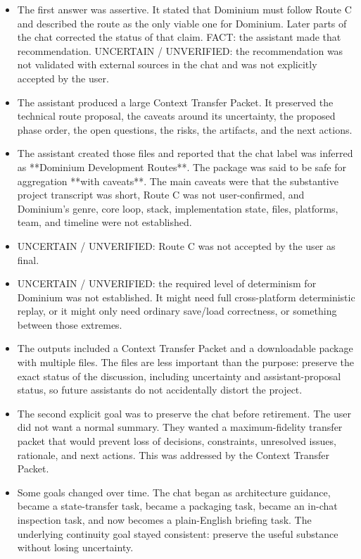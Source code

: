 \documentclass[11pt,a4paper]{report}
\begin{document}
\begin{itemize}
\item The first answer was assertive. It stated that Dominium must follow Route C and described the route as the only viable one for Dominium. Later parts of the chat corrected the status of that claim. FACT: the assistant made that recommendation. UNCERTAIN / UNVERIFIED: the recommendation was not validated with external sources in the chat and was not explicitly accepted by the user.
\item The assistant produced a large Context Transfer Packet. It preserved the technical route proposal, the caveats around its uncertainty, the proposed phase order, the open questions, the risks, the artifacts, and the next actions.
\item The assistant created those files and reported that the chat label was inferred as **Dominium Development Routes**. The package was said to be safe for aggregation **with caveats**. The main caveats were that the substantive project transcript was short, Route C was not user-confirmed, and Dominium's genre, core loop, stack, implementation state, files, platforms, team, and timeline were not established.
\item UNCERTAIN / UNVERIFIED: Route C was not accepted by the user as final.
\item UNCERTAIN / UNVERIFIED: the required level of determinism for Dominium was not established. It might need full cross-platform deterministic replay, or it might only need ordinary save/load correctness, or something between those extremes.
\item The outputs included a Context Transfer Packet and a downloadable package with multiple files. The files are less important than the purpose: preserve the exact status of the discussion, including uncertainty and assistant-proposal status, so future assistants do not accidentally distort the project.
\item The second explicit goal was to preserve the chat before retirement. The user did not want a normal summary. They wanted a maximum-fidelity transfer packet that would prevent loss of decisions, constraints, unresolved issues, rationale, and next actions. This was addressed by the Context Transfer Packet.
\item Some goals changed over time. The chat began as architecture guidance, became a state-transfer task, became a packaging task, became an in-chat inspection task, and now becomes a plain-English briefing task. The underlying continuity goal stayed consistent: preserve the useful substance without losing uncertainty.
\end{itemize}
\end{document}
